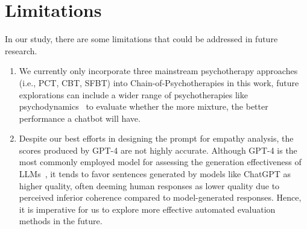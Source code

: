 \section*{Limitations}

In our study, there are some limitations that could be addressed in future research.
\begin{enumerate}
\item We currently only incorporate three mainstream psychotherapy approaches (i.e., PCT, CBT, SFBT) into Chain-of-Psychotherapies in this work, future explorations can include a wider range of psychotherapies like psychodynamics~\cite{Sheppard2006psychodynamics} to evaluate whether the more mixture, the better performance a chatbot will have.
\item  Despite our best efforts in designing the prompt for empathy analysis, the scores produced by GPT-4 are not highly accurate. Although GPT-4 is the most commonly employed model for assessing the generation effectiveness of LLMs~\cite{liu-etal-2023-g}, it tends to favor sentences generated by models like ChatGPT as higher quality, often deeming human responses as lower quality due to perceived inferior coherence compared to model-generated responses. Hence, it is imperative for us to explore more effective automated evaluation methods in the future.
\end{enumerate}